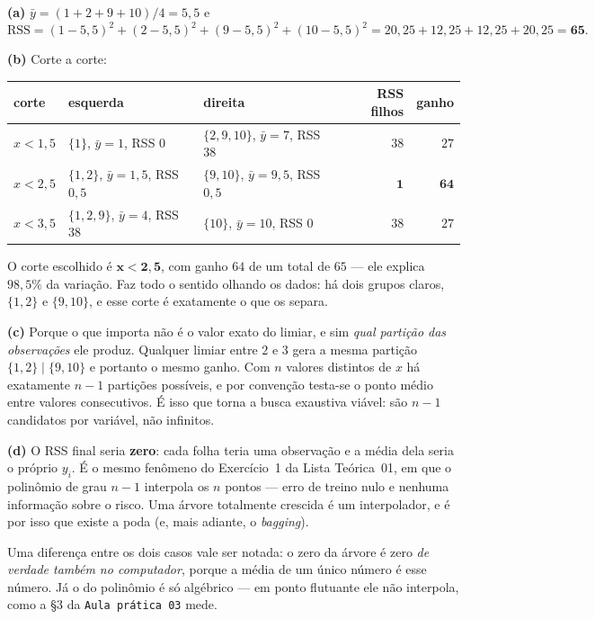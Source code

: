 \documentclass[11pt,a4paper]{article}
\begin{document}
\begin{solucao}
\textbf{(a)} $\bar y=(1+2+9+10)/4=5{,}5$ e
\[
  \mathrm{RSS} = (1-5{,}5)^2+(2-5{,}5)^2+(9-5{,}5)^2+(10-5{,}5)^2
  = 20{,}25+12{,}25+12{,}25+20{,}25 = \mathbf{65}.
\]

\smallskip
\textbf{(b)} Corte a corte:
\begin{center}\small
\renewcommand{\arraystretch}{1.3}
\begin{tabular}{@{}lllrr@{}}
\toprule
corte & esquerda & direita & RSS filhos & ganho \\
\midrule
$x<1{,}5$ & $\{1\}$, $\bar y=1$, RSS $0$      & $\{2,9,10\}$, $\bar y=7$, RSS $38$   & $38$ & $27$ \\
$x<2{,}5$ & $\{1,2\}$, $\bar y=1{,}5$, RSS $0{,}5$ & $\{9,10\}$, $\bar y=9{,}5$, RSS $0{,}5$ & $\mathbf{1}$ & $\mathbf{64}$ \\
$x<3{,}5$ & $\{1,2,9\}$, $\bar y=4$, RSS $38$ & $\{10\}$, $\bar y=10$, RSS $0$       & $38$ & $27$ \\
\bottomrule
\end{tabular}
\end{center}
O corte escolhido é $\mathbf{x<2{,}5}$, com ganho $64$ de um total de $65$ --- ele
explica $98{,}5\%$ da variação. Faz todo o sentido olhando os dados: há dois
grupos claros, $\{1,2\}$ e $\{9,10\}$, e esse corte é exatamente o que os separa.

\smallskip
\textbf{(c)} Porque o que importa não é o valor exato do limiar, e sim
\emph{qual partição das observações} ele produz. Qualquer limiar entre $2$ e $3$
gera a mesma partição $\{1,2\}\mid\{9,10\}$ e portanto o mesmo ganho. Com $n$
valores distintos de $x$ há exatamente $n-1$ partições possíveis, e por convenção
testa-se o ponto médio entre valores consecutivos. É isso que torna a busca
exaustiva viável: são $n-1$ candidatos por variável, não infinitos.

\smallskip
\textbf{(d)} O RSS final seria \textbf{zero}: cada folha teria uma observação e a
média dela seria o próprio $y_i$. É o mesmo fenômeno do Exercício~1 da Lista
Teórica~01, em que o polinômio de grau $n-1$ interpola os $n$ pontos --- erro de
treino nulo e nenhuma informação sobre o risco. Uma árvore totalmente crescida é
um interpolador, e é por isso que existe a poda (e, mais adiante, o
\emph{bagging}).

Uma diferença entre os dois casos vale ser notada: o zero da árvore é zero
\emph{de verdade também no computador}, porque a média de um único número é esse
número. Já o do polinômio é só algébrico --- em ponto flutuante ele não interpola,
como a §3 da \texttt{Aula prática 03} mede.
\end{solucao}
\end{document}
